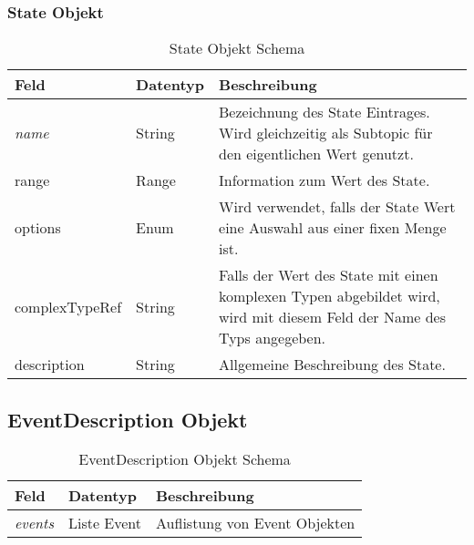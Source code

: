 \subsubsection{State Objekt}
\begin{table}[H]
\begin{tabularx}{\textwidth}{|l|l|X|}

 \hline \rowcolor{lightgray}
 {\bf Feld } & {\bf Datentyp } & {\bf Beschreibung } \\  \hline

 \textit{name}  &   String   & Bezeichnung des State Eintrages. Wird gleichzeitig als Subtopic für den eigentlichen Wert genutzt.  \\ \hline
 range  &   Range   &  Information zum Wert des State.   \\ \hline
 options  &   Enum   & Wird verwendet, falls der State Wert eine Auswahl aus einer fixen Menge ist.   \\ \hline
 complexTypeRef  &   String   & Falls der Wert des State mit einen komplexen Typen abgebildet wird, wird mit diesem Feld der Name des Typs angegeben.   \\ \hline
 description  &   String   &  Allgemeine Beschreibung des State.  \\ \hline

\end{tabularx}
\caption{State Objekt Schema}
\end{table}


\subsection{EventDescription Objekt}
\begin{table}[H]
\begin{tabularx}{\textwidth}{|l|l|X|}

 \hline \rowcolor{lightgray}
 {\bf Feld } & {\bf Datentyp } & {\bf Beschreibung } \\  \hline

 \textit{events}  &   Liste Event   & Auflistung von Event Objekten   \\ \hline

\end{tabularx}
\caption{EventDescription Objekt Schema}
\end{table}


